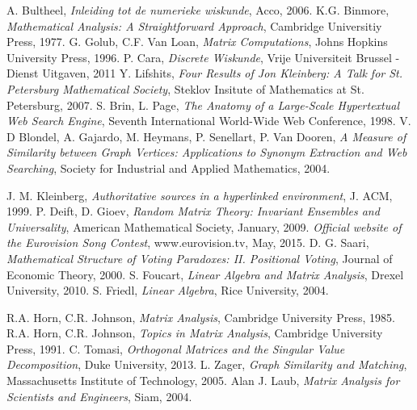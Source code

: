 \documentclass{beamer}
\begin{document}
\begin{frame}
\begin{block}{}

 A. Bultheel, \emph{Inleiding tot de numerieke wiskunde}, Acco, 
2006.
 K.G. Binmore, \emph{Mathematical Analysis: A Straightforward Approach}, Cambridge Universitiy Press, 1977.
 G. Golub, C.F. Van Loan, \emph{Matrix Computations}, 
Johns Hopkins University Press, 1996.
 P. Cara, \emph{Discrete Wiskunde}, Vrije Universiteit Brussel - Dienst 
Uitgaven, 2011
 Y. Lifshits, \emph{Four Results of Jon Kleinberg: A Talk for St. Petersburg Mathematical 
Society}, Steklov Insitute of Mathematics at St. Petersburg, 2007.
 S. Brin, L. Page, \emph{The Anatomy of a Large-Scale Hypertextual Web Search Engine}, Seventh International World-Wide Web Conference, 1998.
 V. D Blondel, A. Gajardo, M. Heymans, P. Senellart, P. Van Dooren, 
\emph{A Measure of Similarity between Graph Vertices: Applications to Synonym Extraction and Web 
Searching}, Society for Industrial and Applied Mathematics, 2004.


\end{block}
\end{frame}
\begin{frame}
\begin{block}{}

 J. M. Kleinberg, \emph{Authoritative sources in a hyperlinked 
environment}, J. ACM, 1999.
 P. Deift, D. Gioev, \emph{Random Matrix Theory: Invariant Ensembles and 
Universality}, American Mathematical Society, January, 2009.
 \emph{Official website of the Eurovision Song 
Contest}, www.eurovision.tv, May, 2015.
 D. G. Saari,  \emph{Mathematical Structure of Voting Paradoxes: II. Positional Voting}, Journal of Economic Theory, 2000.
 S. Foucart, \emph{Linear Algebra and Matrix Analysis}, 
Drexel University, 2010.
 S. Friedl, \emph{Linear Algebra}, Rice University, 
2004.
\end{block}
\end{frame}
\begin{frame}
\begin{block}{}

 R.A. Horn, C.R. Johnson, \emph{Matrix Analysis}, Cambridge University Press, 1985.
 R.A. Horn, C.R. Johnson, \emph{Topics in Matrix 
Analysis}, Cambridge University Press, 1991.
 C. Tomasi, \emph{Orthogonal Matrices and the Singular Value 
Decomposition}, Duke University, 2013.
 L. Zager, \emph{Graph Similarity and Matching}, 
Massachusetts Institute of Technology, 2005.
 Alan J. Laub, \emph{Matrix Analysis for Scientists and 
Engineers}, Siam, 2004.
    \end{block}
\end{frame}
\end{document}
